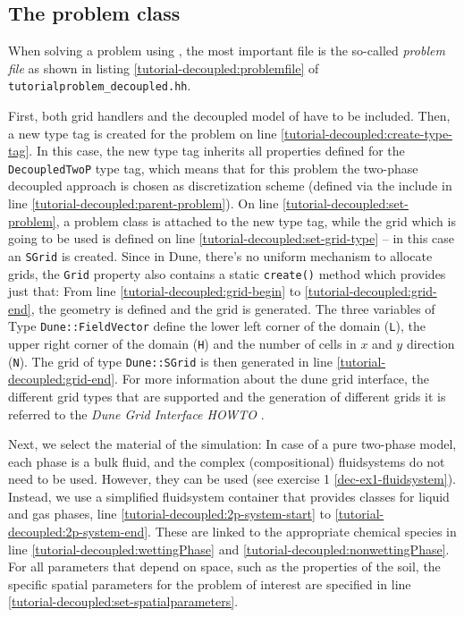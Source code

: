 \subsection{The problem class} \label{decoupled_problem}

When solving a problem using \Dumux, the most important file is the
so-called \textit{problem file} as shown in listing
\ref{tutorial-decoupled:problemfile} of
\texttt{tutorialproblem\_decoupled.hh}.

\begin{lst}\label{tutorial-decoupled:problemfile} \mbox{}

\end{lst}

First, both \Dune  grid handlers and the decoupled model of \Dumux 
have to be included. Then, a new type tag is created for the problem 
on line \ref{tutorial-decoupled:create-type-tag}.  In this case, the 
new type tag inherits all properties defined for the \texttt{DecoupledTwoP} 
type tag, which means that for this problem the two-phase decoupled approach
is chosen as discretization scheme (defined via the include in line 
\ref{tutorial-decoupled:parent-problem}). On line \ref{tutorial-decoupled:set-problem}, 
a problem class is attached to the new type tag, while the grid which
is going to be used is defined on line \ref{tutorial-decoupled:set-grid-type} --
in this case an \texttt{SGrid} is created.  Since in Dune, there's no uniform
mechanism to allocate grids, the \texttt{Grid} property also contains
a static \texttt{create()} method which provides just that: From line 
\ref{tutorial-decoupled:grid-begin} to \ref{tutorial-decoupled:grid-end}, 
the geometry is defined and the grid is generated. The three variables of 
Type \texttt{Dune::FieldVector} define the lower left corner of the domain 
(\texttt{L}), the upper right corner of the domain (\texttt{H}) and the number 
of cells in $x$ and $y$ direction (\texttt{N}). The grid of type 
\texttt{Dune::SGrid} is then generated in line \ref{tutorial-decoupled:grid-end}. 
For more information about the dune grid interface, the different grid types 
that are supported and the generation of different grids it is referred to 
the \textit{Dune Grid Interface HOWTO} \cite{DUNE-HP}. 

Next, we select the material of the simulation: In case of a pure two-phase
model, each phase is a bulk fluid, and the complex (compositional) fluidsystems
do not need to be used. However, they can be used (see exercise 1 \ref{dec-ex1-fluidsystem}). 
Instead, we use a simplified fluidsystem container that provides classes 
for liquid and gas phases, line \ref{tutorial-decoupled:2p-system-start} to 
\ref{tutorial-decoupled:2p-system-end}. These are linked to the appropriate 
chemical species in line \ref{tutorial-decoupled:wettingPhase} and 
\ref{tutorial-decoupled:nonwettingPhase}. For all parameters that depend 
on space, such as the properties of the soil, the specific spatial parameters 
for the problem of interest are specified in line
\ref{tutorial-decoupled:set-spatialparameters}. 

